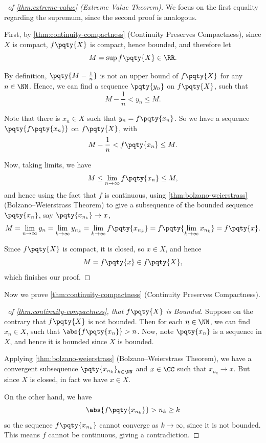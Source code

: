 \begin{proof}[\proofname\ of \autoref{thm:extreme-value} (Extreme Value Theorem)]
    We focus on the first equality regarding the supremum, since the second proof is analogous.

    First, by \autoref{thm:continuity-compactness} (Continuity Preserves Compactness), since \(X\) is compact, \(f\pqty{X}\) is compact, hence bounded, and therefore let
    \[
        M = \sup f\pqty{X} \in \RR.
    \]

    By definition, \(\pqty{M - \frac{1}{n}}\) is not an upper bound of \(f\pqty{X}\) for any \(n \in \NN\). Hence, we can find a sequence \(\pqty{y_n}\) on \(f\pqty{X}\), such that
    \[
        M - \frac{1}{n} < y_n \leq M.
    \]

    Note that there is \(x_n \in X\) such that \(y_n = f\pqty{x_n}\). So we have a sequence \(\pqty{f\pqty{x_n}}\) on \(f\pqty{X}\), with
    \[
        M - \frac{1}{n} < f\pqty{x_n} \leq M.
    \]

    Now, taking limits, we have
    \[
        M \leq \lim_{n \to \infty} f\pqty{x_n} \leq M,
    \]
    and hence using the fact that \(f\) is continuous, using \autoref{thm:bolzano-weierstrass} (Bolzano--Weierstrass Theorem) to give a subsequence of the bounded sequence \(\pqty{x_n}\), say \(\pqty{x_{n_k}} \to x\),
    \[
        M = \lim_{n \to \infty} y_n = \lim_{k \to \infty} y_{n_k} = \lim_{k \to \infty} f\pqty{x_{n_k}} = f\pqty{\lim_{k \to \infty} x_{n_k}} = f\pqty{x}.
    \]

    Since \(f\pqty{X}\) is compact, it is closed, so \(x \in X\), and hence
    \[
        M = f\pqty{x} \in f\pqty{X},
    \]
    which finishes our proof.
\end{proof}

Now we prove \autoref{thm:continuity-compactness} (Continuity Preserves Compactness).

\begin{proof}[\proofname\ of \autoref{thm:continuity-compactness}, that \(f\pqty{X}\) is Bounded]
    Suppose on the contrary that \(f\pqty{X}\) is not bounded. Then for each \(n \in \NN\), we can find \(x_n \in X\), such that \(\abs{f\pqty{x_n}} > n\). Now, note \(\pqty{x_n}\) is a sequence in \(X\), and hence it is bounded since \(X\) is bounded.
    
    Applying \autoref{thm:bolzano-weierstrass} (Bolzano--Weierstrass Theorem), we have a convergent subsequence \(\pqty{x_{n_k}}_{k \in \NN}\) and \(x \in \CC\) such that \(x_{n_k} \to x\). But since \(X\) is closed, in fact we have \(x \in X\).
    
    On the other hand, we have
    \[
        \abs{f\pqty{x_{n_k}}} > n_k \geq k
    \]
    so the sequence \(f\pqty{x_{n_k}}\) cannot converge as \(k \to \infty\), since it is not bounded. This means \(f\) cannot be continuous, giving a contradiction.
\end{proof}

